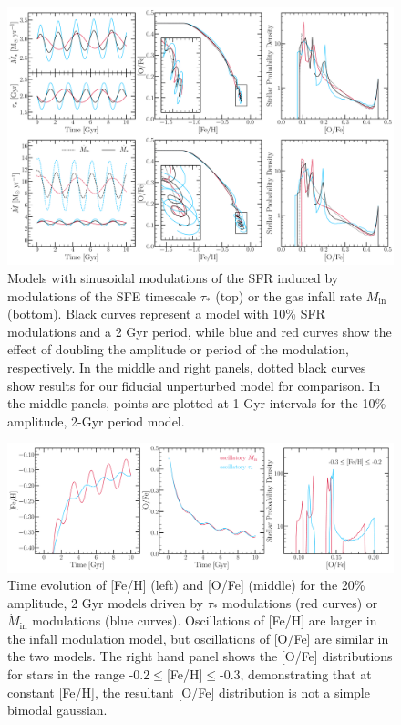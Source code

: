 \begin{figure} %
\includegraphics[scale = 0.32]{oscil.pdf} 
\caption{
Models with sinusoidal modulations of the SFR induced by modulations of the 
SFE timescale $\tau_*$ (top) or the gas infall rate $\dot{M}_\text{in}$ 
(bottom). Black curves represent a model with 10\% SFR modulations and a 2 Gyr 
period, while blue and red curves show the effect of doubling the amplitude or 
period of the modulation, respectively. In the middle and right panels, dotted 
black curves show results for our fiducial unperturbed model for comparison. 
In the middle panels, points are plotted at 1-Gyr intervals for the 10\% 
amplitude, 2-Gyr period model.
} 
\label{bursts:fig:oscil} 
\end{figure} 

\begin{figure} %
\includegraphics[scale = 0.32]{oscillations_v_time.pdf} 
\caption{
Time evolution of [Fe/H] (left) and [O/Fe] (middle) for the 20\% amplitude, 2 
Gyr models driven by $\tau_*$ modulations (red curves) or $\dot{M}_\text{in}$ 
modulations (blue curves). Oscillations of [Fe/H] are larger in the infall 
modulation model, but oscillations of [O/Fe] are similar in the two models. 
The right hand panel shows the [O/Fe] distributions for stars in the range 
-0.2$\leq$[Fe/H]$\leq$-0.3, demonstrating that at constant [Fe/H], the 
resultant [O/Fe] distribution is not a simple bimodal gaussian. 
} 
\label{bursts:fig:oscil_v_time} 
\end{figure}

